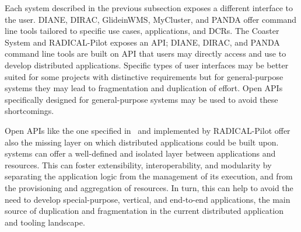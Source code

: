\documentclass{sig-alternate}
\begin{document}







Each \pilot system described in the previous subsection exposes a different
interface to the user.  DIANE,
DIRAC, GlideinWMS, MyCluster, and PANDA offer command line tools tailored to
specific use cases, applications, and DCRs. The Coaster System and RADICAL-Pilot
exposes an API; DIANE, DIRAC, and PANDA command line tools are built on API that
users may directly access and use to develop distributed applications. Specific
types of user interfaces may be better suited for some projects with distinctive
requirements but for general-purpose \pilot systems they may lead to
fragmentation and duplication of effort. Open APIs specifically designed for
general-purpose \pilot systems may be used to avoid these shortcomings.

 


Open APIs like the one specified in~\cite{luckow2012towards} and implemented by
RADICAL-Pilot offer also the missing layer on which distributed applications
could be built upon. \pilot systems can offer a well-defined and isolated layer
between applications and resources. This can foster extensibility,
interoperability, and modularity by separating the application logic from the
management of its execution, and from the provisioning and aggregation of
resources. In turn, this can help to avoid the need to develop special-purpose,
vertical, and end-to-end applications, the main source of duplication and
fragmentation in the current distributed application and tooling landscape.
\end{document}
